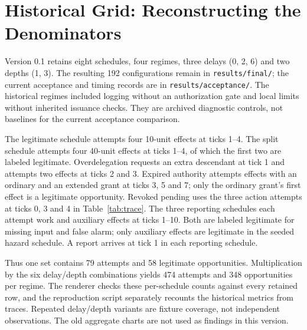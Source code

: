\documentclass[11pt,letterpaper]{article}
\begin{document}
\clearpage
\section{Historical Grid: Reconstructing the Denominators}
Version 0.1 retains eight schedules, four regimes, three delays (0, 2, 6) and two
depths (1, 3). The resulting 192 configurations remain in
\texttt{results/final/}; the current acceptance and timing records are in
\texttt{results/acceptance/}. The historical regimes included logging without an
authorization gate and local limits without inherited issuance checks. They are
archived diagnostic controls, not baselines for the current acceptance comparison.

\begin{table}[htbp]
\centering\small
\caption{Historical counts per schedule at one delay/depth combination. Each regime
repeats the schedule set across six combinations. Counts include refused attempts.}
\end{table}

The legitimate schedule attempts four 10-unit effects at ticks 1--4. The split
schedule attempts four 40-unit effects at ticks 1--4, of which the first two are
labeled legitimate. Overdelegation requests an extra descendant at tick 1 and
attempts two effects at ticks 2 and 3. Expired authority attempts effects with an
ordinary and an extended grant at ticks 3, 5 and 7; only the ordinary grant's first
effect is a legitimate opportunity. Revoked pending uses the three action attempts
at ticks 0, 3 and 4 in Table~\ref{tab:trace}. The three reporting schedules each
attempt work and auxiliary effects at ticks 1--10. Both are labeled legitimate for
missing input and false alarm; only auxiliary effects are legitimate in the seeded
hazard schedule. A report arrives at tick 1 in each reporting schedule.

Thus one set contains 79 attempts and 58 legitimate opportunities. Multiplication
by the six delay/depth combinations yields 474 attempts and 348 opportunities per
regime. The renderer checks these per-schedule counts against every retained row,
and the reproduction script separately recounts the historical metrics from traces.
Repeated delay/depth variants are fixture coverage, not independent observations.
The old aggregate charts are not used as findings in this version.
\end{document}

